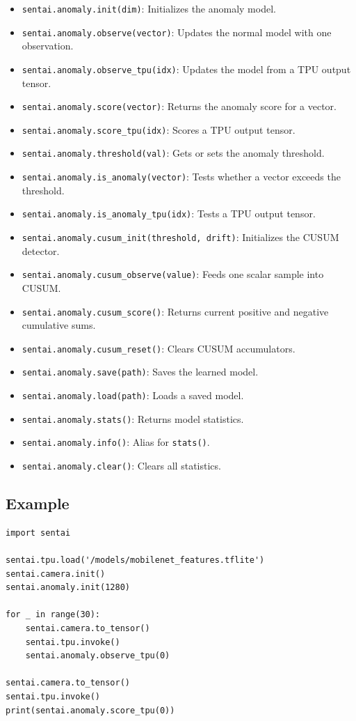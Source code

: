\begin{itemize}
\tightlist
\item
  \texttt{sentai.anomaly.init(dim)}: Initializes the anomaly model.
\item
  \texttt{sentai.anomaly.observe(vector)}: Updates the normal model with
  one observation.
\item
  \texttt{sentai.anomaly.observe\_tpu(idx)}: Updates the model from a
  TPU output tensor.
\item
  \texttt{sentai.anomaly.score(vector)}: Returns the anomaly score for a
  vector.
\item
  \texttt{sentai.anomaly.score\_tpu(idx)}: Scores a TPU output tensor.
\item
  \texttt{sentai.anomaly.threshold(val)}: Gets or sets the anomaly
  threshold.
\item
  \texttt{sentai.anomaly.is\_anomaly(vector)}: Tests whether a vector
  exceeds the threshold.
\item
  \texttt{sentai.anomaly.is\_anomaly\_tpu(idx)}: Tests a TPU output
  tensor.
\item
  \texttt{sentai.anomaly.cusum\_init(threshold,\ drift)}: Initializes
  the CUSUM detector.
\item
  \texttt{sentai.anomaly.cusum\_observe(value)}: Feeds one scalar sample
  into CUSUM.
\item
  \texttt{sentai.anomaly.cusum\_score()}: Returns current positive and
  negative cumulative sums.
\item
  \texttt{sentai.anomaly.cusum\_reset()}: Clears CUSUM accumulators.
\item
  \texttt{sentai.anomaly.save(path)}: Saves the learned model.
\item
  \texttt{sentai.anomaly.load(path)}: Loads a saved model.
\item
  \texttt{sentai.anomaly.stats()}: Returns model statistics.
\item
  \texttt{sentai.anomaly.info()}: Alias for \texttt{stats()}.
\item
  \texttt{sentai.anomaly.clear()}: Clears all statistics.
\end{itemize}

\subsection{Example}\label{example-18}

\begin{verbatim}
import sentai

sentai.tpu.load('/models/mobilenet_features.tflite')
sentai.camera.init()
sentai.anomaly.init(1280)

for _ in range(30):
    sentai.camera.to_tensor()
    sentai.tpu.invoke()
    sentai.anomaly.observe_tpu(0)

sentai.camera.to_tensor()
sentai.tpu.invoke()
print(sentai.anomaly.score_tpu(0))
\end{verbatim}

